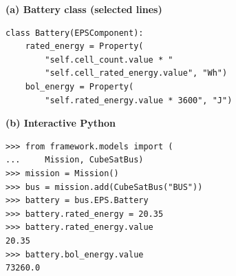 \documentclass[border=5pt]{standalone}
\begin{document}
\begin{minipage}{510pt}
\fontsize{10}{12}\selectfont
\begin{minipage}[t]{250pt}
\vspace{0pt}\textbf{(a) Battery class (selected lines)}\par\smallskip
\begin{lstlisting}[style=report-python,basicstyle=\ttfamily\fontsize{8}{10.24}\selectfont]
class Battery(EPSComponent):
    rated_energy = Property(
        "self.cell_count.value * "
        "self.cell_rated_energy.value", "Wh")
    bol_energy = Property(
        "self.rated_energy.value * 3600", "J")
\end{lstlisting}
\end{minipage}\hfill
\begin{minipage}[t]{250pt}
\vspace{0pt}\textbf{(b) Interactive Python}\par\smallskip
\begin{lstlisting}[style=report-python,basicstyle=\ttfamily\fontsize{8}{10.24}\selectfont]
>>> from framework.models import (
...     Mission, CubeSatBus)
>>> mission = Mission()
>>> bus = mission.add(CubeSatBus("BUS"))
>>> battery = bus.EPS.Battery
>>> battery.rated_energy = 20.35
>>> battery.rated_energy.value
20.35
>>> battery.bol_energy.value
73260.0
\end{lstlisting}
\end{minipage}
\end{minipage}
\end{document}
